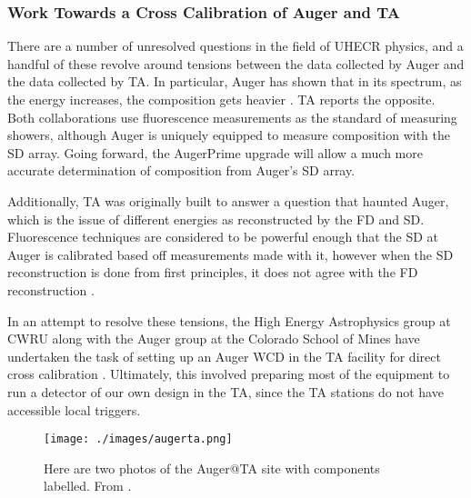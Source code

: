 \subsubsection{Work Towards a Cross Calibration of Auger and TA}
\label{augertamotiv}
There are a number of unresolved questions in the field of UHECR physics, and a handful of these revolve around tensions between the data collected by Auger and the data collected by TA. In particular, Auger has shown that in its spectrum, as the energy increases, the composition gets heavier \cite{heavycomp}. TA reports the opposite. Both collaborations use fluorescence measurements as the standard of measuring showers, although Auger is uniquely equipped to measure composition with the SD array. Going forward, the AugerPrime upgrade will allow a much more accurate determination of composition from Auger's SD array.

Additionally, TA was originally built to answer a question that haunted Auger, which is the issue of different energies as reconstructed by the FD and SD. Fluorescence techniques are considered to be powerful enough that the SD at Auger is calibrated based off measurements made with it, however when the SD reconstruction is done from first principles, it does not agree with the FD reconstruction \cite{tale}.

In an attempt to resolve these tensions, the High Energy Astrophysics group at CWRU along with the Auger group at the Colorado School of Mines have undertaken the task of setting up an Auger WCD in the TA facility for direct cross calibration \cite{sean}. Ultimately, this involved preparing most of the equipment to run a detector of our own design in the TA, since the TA stations do not have accessible local triggers. 


\begin{figure}[h!]
\begin{center}
\texttt{[image: ./images/augerta.png]}
\caption[Auger@TA Setup]{Here are two photos of the Auger@TA site with components labelled. From \textcite{sean}.}
\label{augta}
\end{center}
\end{figure}

